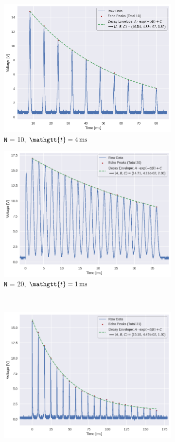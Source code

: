 \documentclass[
    floatfix,  %
    reprint,
    amsmath,amssymb,
    aps,
]{revtex4-2}
\newcommand{\taucode}{\mathgtt{t}}
\begin{document}
\begin{figure}[hbpt]
    \centering
    \begin{subfigure}{0.4\linewidth}
        \includegraphics[width = 0.8\linewidth]{figs/purcell/data2.png}
        \caption{\texttt{N} = 10, $\taucode = \SI{4}{\milli\second}$}
    \end{subfigure}
    \begin{subfigure}{0.4\linewidth}
        \includegraphics[width = 0.8\linewidth]{figs/purcell/data3.png}
        \caption{\texttt{N} = 20, $\taucode = \SI{1}{\milli\second}$}
    \end{subfigure}\\
    \begin{subfigure}{0.4\linewidth}
        \includegraphics[width = 0.8\linewidth]{figs/purcell/data1.png}

\end{subfigure}
\end{figure}
\end{document}
